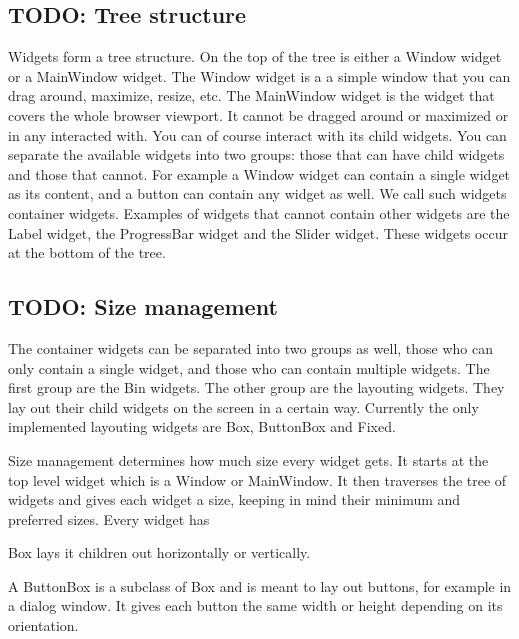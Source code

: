 \documentclass[11pt]{article}
\begin{document}
\subsection{TODO: Tree structure}



Widgets form a tree structure.
On the top of the tree is either a Window widget or a MainWindow widget.
The Window widget is a a simple window that you can drag around, maximize, resize, etc.
The MainWindow widget is the widget that covers the whole browser viewport.
It cannot be dragged around or maximized or in any interacted with.
You can of course interact with its child widgets.
You can separate the available widgets into two groups: those that can have child widgets and those that cannot.
For example a Window widget can contain a single widget as its content, and a button can contain any widget as well.
We call such widgets container widgets.
Examples of widgets that cannot contain other widgets are the Label widget, the ProgressBar widget and the Slider widget.
These widgets occur at the bottom of the tree.




\subsection{TODO: Size management}




The container widgets can be separated into two groups as well, those who can only contain a single widget, and those who can contain multiple widgets.
The first group are the Bin widgets.
The other group are the layouting widgets.
They lay out their child widgets on the screen in a certain way.
Currently the only implemented layouting widgets are Box, ButtonBox and Fixed.

Size management determines how much size every widget gets.
It starts at the top level widget which is a Window or MainWindow.
It then traverses the tree of widgets and gives each widget a size, keeping in mind their minimum and preferred sizes.
Every widget has 

Box lays it children out horizontally or vertically.


A ButtonBox is a subclass of Box and is meant to lay out buttons, for example in a dialog window.
It gives each button the same width or height depending on its orientation.



\end{document}
